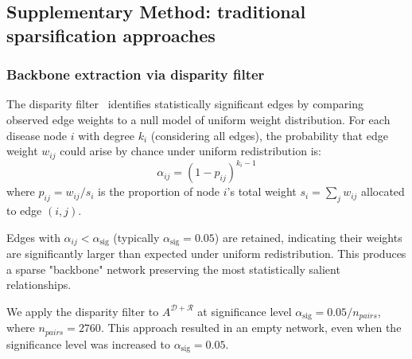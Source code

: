 \setcounter{table}{0}          
\renewcommand{\thetable}{S\arabic{table}}

\setcounter{subsection}{0}
\renewcommand{\thesubsection}{S\arabic{subsection}}

\subsection{Supplementary Method: traditional sparsification approaches}\label{supp_met_1}
\subsubsection{Backbone extraction via disparity filter}\label{subsec:backbone}
The disparity filter~\cite{serrano2009extracting} identifies statistically significant edges by comparing observed edge weights to a null model of uniform weight distribution. For each disease node $i$ with degree $k_i$ (considering all edges), the probability that edge weight $w_{ij}$ could arise by chance under uniform redistribution is:
\begin{equation}\label{eq:disparity_filter}
\alpha_{ij} = (1 - p_{ij})^{k_i - 1}
\end{equation}
where $p_{ij} = w_{ij} / s_i$ is the proportion of node $i$'s total weight $s_i = \sum_j w_{ij}$ allocated to edge $(i,j)$.

Edges with $\alpha_{ij} < \alpha_{\text{sig}}$ (typically $\alpha_{\text{sig}} = 0.05$) are retained, indicating their weights are significantly larger than expected under uniform redistribution. This produces a sparse "backbone" network preserving the most statistically salient relationships.

We apply the disparity filter to $A^{\mathcal{D+R}}$ at significance level $\alpha_{\text{sig}} = 0.05/n_{pairs}$, where $n_{pairs} = 2760$. This approach resulted in an empty network, even when the significance level was increased to $\alpha_{\text{sig}} = 0.05$. 

